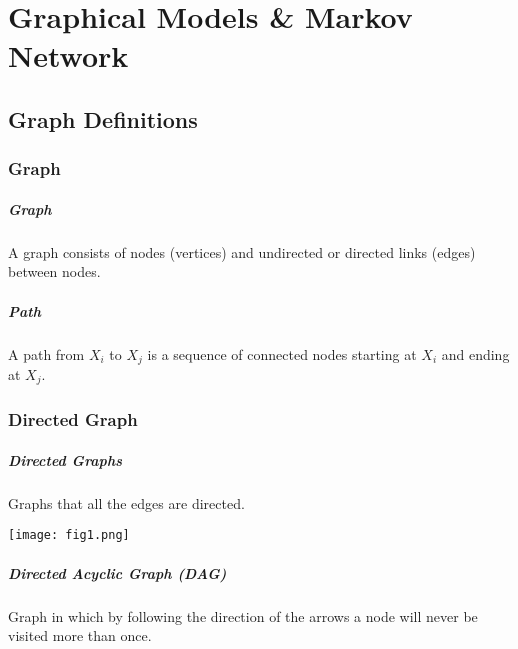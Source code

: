 
\graphicspath{{Chapter12/Figs/}}

\chapter{Graphical Models \& Markov Network}
\label{chapter12}



\section{Graph Definitions}
\label{section12.1}

\subsection{Graph}

\paragraph{Graph}

A graph consists of nodes (vertices) and undirected or directed links (edges) between nodes.

\paragraph{Path}

A path from $X_i$ to $X_j$ is a sequence of connected nodes starting at $X_i$ and ending at $X_j$.

\subsection{Directed Graph}

\paragraph{Directed Graphs}

Graphs that all the edges are directed.
\begin{figure*}[h]
	\centering
	\texttt{[image: fig1.png]}
\end{figure*}

\paragraph{Directed Acyclic Graph (DAG)}

Graph in which by following the direction of the arrows a node will never be visited more than once.

